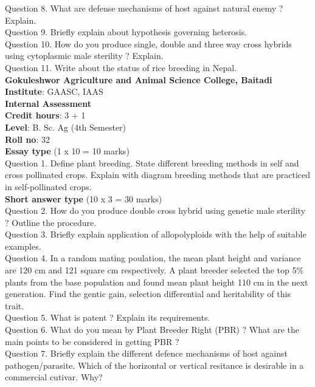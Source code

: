 \documentclass[12pt]{article}\usepackage[]{graphicx}\usepackage[]{color}
\begin{document}
Question 8. What are defense mechanisms of host against natural enemy ? Explain.\\
Question 9. Briefly explain about hypothesis governing heterosis.\\
Question 10. How do you produce single, double and three way cross hybrids using cytoplasmic male sterility ? Explain.\\
Question 11. Write about the status of rice breeding in Nepal.\\
\clearpage 
{\centering \Large{\textbf{Gokuleshwor Agriculture and Animal Science College, Baitadi}} \\[0.25cm]
            \textbf{Institute}: GAASC, IAAS \\[0.2cm]
            \textbf{Internal Assessment} \\[0.2cm]} 
\textbf{Credit hours}: 3 + 1 \\ 
\textbf{Level}: B. Sc. Ag (4th Semester) \\
\textbf{Roll no}: 32 \\[0.5cm] 
\textbf{Essay type} (1 x 10 = 10 marks) \\
Question 1. Define plant breeding. State different breeding methods in self and cross pollinated crops. Explain with diagram breeding methods that are practiced in self-pollinated crops.\\
\textbf{Short answer type} (10 x 3 = 30 marks) \\
Question 2. How do you produce double cross hybrid using genetic male sterility ? Outline the procedure.\\
Question 3. Briefly explain application of allopolyploids with the help of suitable examples.\\
Question 4. In a random mating poulation, the mean plant height and variance are 120 cm and 121 square cm respectively. A plant breeder selected the top 5\% plants from the base population and found mean plant height 110 cm in the next generation. Find the gentic gain, selection differential and heritability of this trait.\\
Question 5. What is patent ? Explain its requirements.\\
Question 6. What do you mean by Plant Breeder Right (PBR) ? What are the main points to be considered in getting PBR ?\\
Question 7. Briefly explain the different defence mechanisms of host against pathogen/parasite. Which of the horizontal or vertical resitance is desirable in a commercial cutivar. Why?\\
\end{document}
